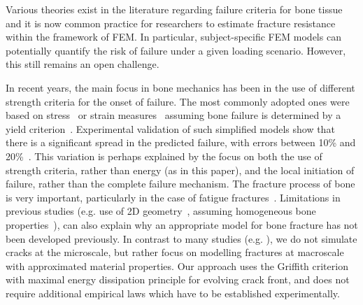 \documentclass[onecolumn]{svjour3}
\begin{document}
Various theories exist in the literature regarding failure criteria for bone tissue and it is now common practice for researchers to estimate fracture resistance within the framework of FEM. In particular, subject-specific FEM models can potentially quantify the risk of failure under a given loading scenario. However, this still remains an open challenge.

In recent years, the main focus in bone mechanics has been in the use of different strength criteria for the onset of failure. 
The most commonly adopted ones were based on stress~\cite{keyak2005predicting} or strain measures~\cite{schileo2008subject} assuming bone failure is determined by a yield criterion~\cite{yosibash2010predicting}. 
Experimental validation of such simplified models show that there is a significant spread in the predicted failure, with errors between 10\% and 20\%~\cite{van2014accurately}.
This variation is perhaps explained by the focus on both the use of strength criteria, rather than energy (as in this paper), and the local initiation of failure, rather than the complete failure mechanism.
The fracture process of bone is very important,  particularly in the case of fatigue fractures~\cite{gupta2008fracture}. 
Limitations in previous studies (e.g. use of 2D geometry~\cite{bettamer2017using}, assuming homogeneous bone properties~\cite{gasser2007numerical}), 
can also explain why an appropriate model for bone fracture has not been developed previously. In contrast to many studies (e.g. \cite{marco2018heterogeneous}), we do not simulate cracks at the microscale, but rather focus on modelling fractures at macroscale with approximated material properties. Our approach uses the Griffith criterion with maximal energy dissipation principle for evolving crack front, and does not require additional empirical laws which have to be established experimentally.
\end{document}
